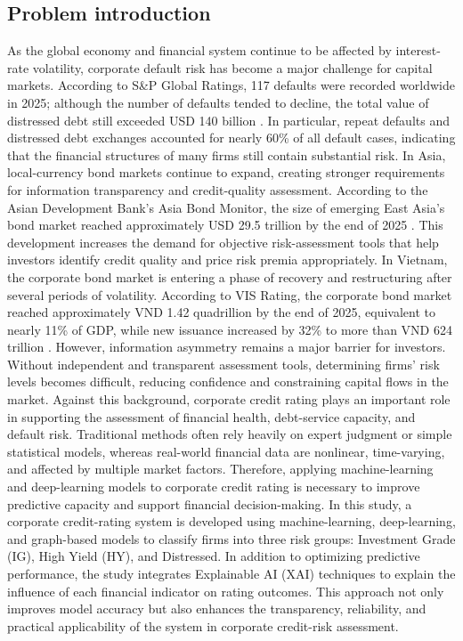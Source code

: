 \documentclass[10pt,twoside]{article}
\begin{document}
\subsection{Problem introduction}
As the global economy and financial system continue to be affected by interest-rate volatility, corporate default risk has become a major challenge for capital markets. According to S\&P Global Ratings, 117 defaults were recorded worldwide in 2025; although the number of defaults tended to decline, the total value of distressed debt still exceeded USD 140 billion \cite{noauthor_default_nodate}. In particular, repeat defaults and distressed debt exchanges accounted for nearly 60\% of all default cases, indicating that the financial structures of many firms still contain substantial risk. In Asia, local-currency bond markets continue to expand, creating stronger requirements for information transparency and credit-quality assessment. According to the Asian Development Bank's Asia Bond Monitor, the size of emerging East Asia's bond market reached approximately USD 29.5 trillion by the end of 2025 \cite{bank_asia_2025}. This development increases the demand for objective risk-assessment tools that help investors identify credit quality and price risk premia appropriately. In Vietnam, the corporate bond market is entering a phase of recovery and restructuring after several periods of volatility. According to VIS Rating, the corporate bond market reached approximately VND 1.42 quadrillion by the end of 2025, equivalent to nearly 11\% of GDP, while new issuance increased by 32\% to more than VND 624 trillion \cite{noauthor_vis_nodate}. However, information asymmetry remains a major barrier for investors. Without independent and transparent assessment tools, determining firms' risk levels becomes difficult, reducing confidence and constraining capital flows in the market. Against this background, corporate credit rating plays an important role in supporting the assessment of financial health, debt-service capacity, and default risk. Traditional methods often rely heavily on expert judgment or simple statistical models, whereas real-world financial data are nonlinear, time-varying, and affected by multiple market factors. Therefore, applying machine-learning and deep-learning models to corporate credit rating is necessary to improve predictive capacity and support financial decision-making. In this study, a corporate credit-rating system is developed using machine-learning, deep-learning, and graph-based models to classify firms into three risk groups: Investment Grade (IG), High Yield (HY), and Distressed. In addition to optimizing predictive performance, the study integrates Explainable AI (XAI) techniques to explain the influence of each financial indicator on rating outcomes. This approach not only improves model accuracy but also enhances the transparency, reliability, and practical applicability of the system in corporate credit-risk assessment.
\end{document}
